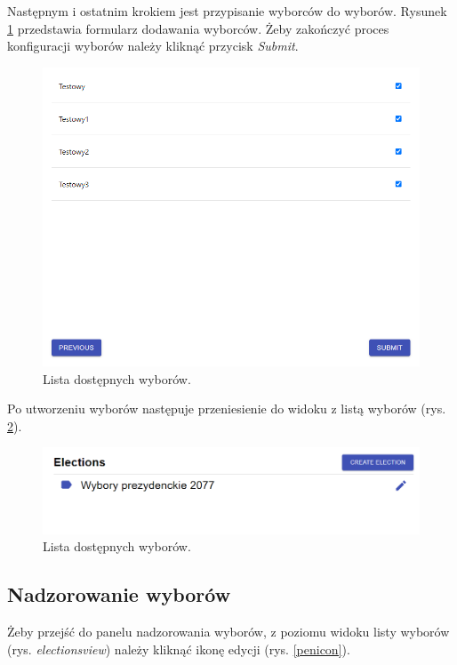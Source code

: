 \documentclass[a4paper,12pt]{book}
\begin{document}
Następnym i ostatnim krokiem jest przypisanie wyborców do wyborów. Rysunek \ref{choosevoters} przedstawia formularz dodawania wyborców. Żeby zakończyć proces konfiguracji wyborów należy kliknąć przycisk \textit{Submit}.

\begin{figure}[H]
	\centering
	\includegraphics[width=\textwidth]{images/choosevoters.png}
	\caption{Lista dostępnych wyborów.}\label{choosevoters}
\end {figure}

Po utworzeniu wyborów następuje przeniesienie do widoku z listą wyborów (rys. \ref{electionsview}).

\begin{figure}[h]
	\centering
	\includegraphics[width=\textwidth]{images/electionsview.png}
	\caption{Lista dostępnych wyborów.}\label{electionsview}
\end {figure}

\subsection{Nadzorowanie wyborów}

Żeby przejść do panelu nadzorowania wyborów, z poziomu widoku listy wyborów (rys. \textit{electionsview}) należy kliknąć ikonę edycji (rys. \ref{penicon}).
\end{document}
